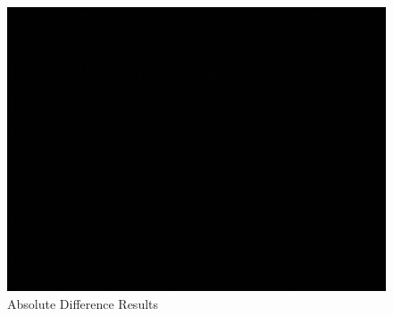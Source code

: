 		\begin{figure}[H]
			\includegraphics[width=\linewidth]{figsrc/simulation/normal/surf_absdiff.png}
			\caption{Absolute Difference Results}
			\label{fig:siftAbsDifference}
		\end{figure}


